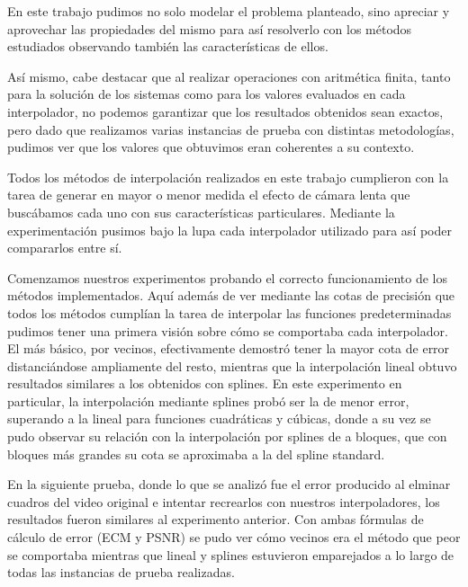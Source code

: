 \setlength{\parindent}{15.0pt} %
En este trabajo pudimos no solo modelar el problema planteado, sino 
apreciar y aprovechar las propiedades del mismo para así resolverlo con los
métodos estudiados observando también las características de ellos.

Así mismo, cabe destacar que al realizar operaciones con aritmética finita,
tanto para la solución de los sistemas como para los valores evaluados en cada
interpolador, no podemos garantizar que los resultados obtenidos sean exactos,
pero dado que realizamos varias instancias de prueba con distintas metodologías,
pudimos ver que los valores que obtuvimos eran coherentes a su contexto.

Todos los métodos de interpolación realizados en este trabajo cumplieron con la
tarea de generar en mayor o menor medida el efecto de cámara lenta que
buscábamos cada uno con sus características particulares. Mediante la
experimentación pusimos bajo la lupa cada interpolador utilizado para así poder
compararlos entre sí.

Comenzamos nuestros experimentos probando el correcto funcionamiento de los
métodos implementados. Aquí además de ver mediante las cotas de precisión que
todos los métodos cumplían la tarea de interpolar las funciones predeterminadas
pudimos tener una primera visión sobre cómo se comportaba cada interpolador. El
más básico, por vecinos, efectivamente demostró tener la mayor cota de error
distanciándose ampliamente del resto, mientras que la interpolación lineal
obtuvo resultados similares a los obtenidos con splines. En este experimento en
particular, la interpolación mediante splines probó ser la de menor error,
superando a la lineal para funciones cuadráticas y cúbicas, donde a su vez se
pudo observar su relación con la interpolación por splines de a bloques, que con
bloques más grandes su cota se aproximaba a la del spline standard.

En la siguiente prueba, donde lo que se analizó fue el error producido al
elminar cuadros del video original e intentar recrearlos con nuestros
interpoladores, los resultados fueron similares al experimento anterior. Con
ambas fórmulas de cálculo de error (ECM y PSNR) se pudo ver cómo vecinos era el
método que peor se comportaba mientras que lineal y splines estuvieron
emparejados a lo largo de todas las instancias de prueba realizadas.

